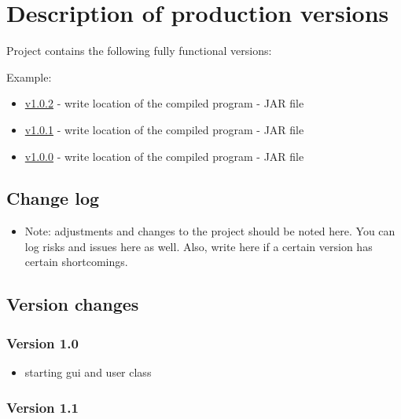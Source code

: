 \documentclass[
]{report}
\providecommand{\tightlist}{%
  \setlength{\itemsep}{0pt}\setlength{\parskip}{0pt}}
\begin{document}
\hypertarget{description-of-production-versions}{%
\chapter{Description of production versions}\label{description-of-production-versions}}

Project contains the following fully functional versions:

Example:

\begin{itemize}
\tightlist
\item
  \href{jar/v1.0.0.2.jar}{v1.0.2} - write location of the compiled program - JAR file
\item
  \href{jar/v1.0.0.2.jar}{v1.0.1} - write location of the compiled program - JAR file
\item
  \href{jar/v1.0.0.2.jar}{v1.0.0} - write location of the compiled program - JAR file
\end{itemize}

\hypertarget{change-log}{%
\section{Change log}\label{change-log}}

\begin{itemize}
\tightlist
\item
  Note: adjustments and changes to the project should be noted here. You can log risks and issues here as well. Also, write here if a certain version has certain shortcomings.
\end{itemize}

\hypertarget{version-changes}{%
\section{Version changes}\label{version-changes}}

\hypertarget{version-1.0}{%
\subsection{Version 1.0}\label{version-1.0}}

\begin{itemize}
\tightlist
\item
  starting gui and user class
\end{itemize}

\hypertarget{version-1.1}{%
\subsection{Version 1.1}\label{version-1.1}}
\end{document}
